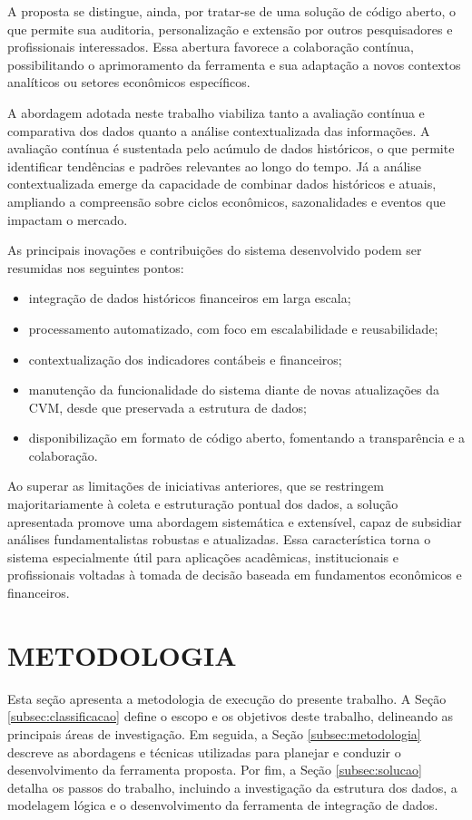 \documentclass[recuosum=1.5cm]{iftex2024}
\begin{document}
A proposta se distingue, ainda, por tratar-se de uma solução de código aberto, o que permite sua auditoria, personalização e extensão por outros pesquisadores e profissionais interessados. Essa abertura favorece a colaboração contínua, possibilitando o aprimoramento da ferramenta e sua adaptação a novos contextos analíticos ou setores econômicos específicos.

A abordagem adotada neste trabalho viabiliza tanto a avaliação contínua e comparativa dos dados quanto a análise contextualizada das informações. A avaliação contínua é sustentada pelo acúmulo de dados históricos, o que permite identificar tendências e padrões relevantes ao longo do tempo. Já a análise contextualizada emerge da capacidade de combinar dados históricos e atuais, ampliando a compreensão sobre ciclos econômicos, sazonalidades e eventos que impactam o mercado.

As principais inovações e contribuições do sistema desenvolvido podem ser resumidas nos seguintes pontos:

\begin{itemize}
	\item integração de dados históricos financeiros em larga escala;
	\item processamento automatizado, com foco em escalabilidade e reusabilidade;
	\item contextualização dos indicadores contábeis e financeiros;
	\item manutenção da funcionalidade do sistema diante de novas atualizações da CVM, desde que preservada a estrutura de dados;
	\item disponibilização em formato de código aberto, fomentando a transparência e a colaboração.
\end{itemize}

Ao superar as limitações de iniciativas anteriores, que se restringem majoritariamente à coleta e estruturação pontual dos dados, a solução apresentada promove uma abordagem sistemática e extensível, capaz de subsidiar análises fundamentalistas robustas e atualizadas. Essa característica torna o sistema especialmente útil para aplicações acadêmicas, institucionais e profissionais voltadas à tomada de decisão baseada em fundamentos econômicos e financeiros.

\chapter{METODOLOGIA}
Esta seção apresenta a metodologia de execução do presente trabalho.
A Seção \ref{subsec:classificacao} define o escopo e os objetivos deste trabalho, delineando as principais áreas de investigação.
Em seguida, a Seção \ref{subsec:metodologia} descreve as abordagens e técnicas utilizadas para planejar e conduzir o desenvolvimento da ferramenta proposta.
Por fim, a Seção \ref{subsec:solucao} detalha os passos do trabalho, incluindo a investigação da estrutura dos dados, a modelagem lógica e o desenvolvimento da ferramenta de integração de dados.
\end{document}
